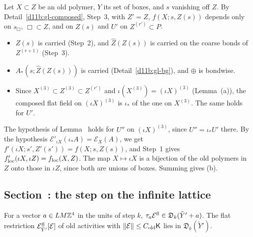 \begin{step}
Let $X\subset Z$ be an old polymer, $Y$ its set of boxes, and $s$ vanishing off $Z$. By Detail~\ref{d11b:gl-composed}, Step~3, with $Z'=Z$, $f(X;s,Z(s))$ depends only on $s_\Box$, $\Box\subset Z$, and on $Z(s)$ and $U'$ on $Z^{(r')}\subset P$.
\begin{itemize}
\item $Z(s)$ is carried (Step~2), and $\hat Z(Z(s))$ is carried on the coarse bonds of $Z^{(r+1)}$ (Step~3).
\item $A_*(s;\hat Z(Z(s)))$ is carried (Detail~\ref{d11b:gl-bg}), and $\oplus$ is bondwise.
\item Since $X^{(3)}\subset Z^{(3)}\subset Z^{(r')}$ and $\iota(X^{(3)})=(\iota X)^{(3)}$ (Lemma~(a)), the composed flat field on $(\iota X)^{(3)}$ is $\iota_*$ of the one on $X^{(3)}$. The same holds for $U'$.
\end{itemize}
The hypothesis of Lemma~ holds for $U''$ on $(\iota X)^{(3)}$, since $U''=\iota_*U'$ there. By the hypothesis $\mathcal E'_{\iota X}(\iota_*A)=\mathcal E_X(A)$, we get $f'(\iota X;s',Z'(s'))=f(X;s,Z(s))$, and Step~1 gives $f'_{\rm loc}(\iota X,\iota Z)=f_{\rm loc}(X,Z)$. The map $X\mapsto\iota X$ is a bijection of the old polymers in $Z$ onto those in $\iota Z$, since both are unions of boxes. Summing gives (b).
\end{step}

\subsection{Section~\texorpdfstring{}{59}: the step on the infinite lattice}\label{d11b:59c}

\begin{detail}\label{d11b:gl-flatdata}
For a vector $a\in LM\mathbb Z^4$ in the units of step $k$, $\tau_a\mathcal E^{\rm fl}\in\mathfrak D_k(\tilde Y'+a)$. The flat restriction $\mathcal E^{\rm fl}_{\tilde Y'}[\mathcal E]$ of old activities with $\|\mathcal E\|\le C_{\rm old}\mathsf K$ lies in $\mathfrak D_k(\tilde Y')$.
\end{detail}

